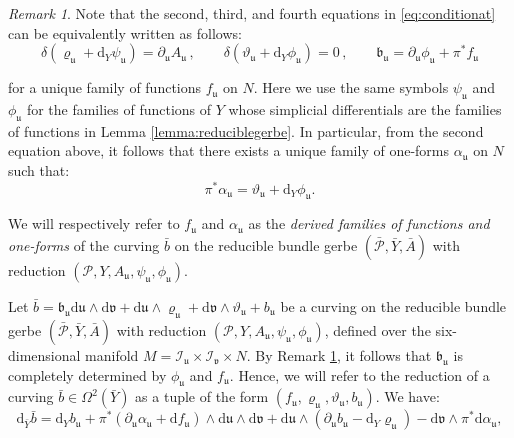 \documentclass[10pt,a4paper,twoside,reqno]{amsart}
\theoremstyle{plain}
\theoremstyle{definition}
\theoremstyle{remark}
\newtheorem{remark}[thm]{Remark}
\def\dd{\mathrm{d}}
\def\cI{\mathcal{I}}
\def\cP{\mathcal{P}}
\def\cP{\mathcal{P}}
\def\dd{\mathrm{d}}
\def\fru{\mathfrak{u}}
\def\frv{\mathfrak{v}}
\begin{document}
\begin{remark}
\label{remark:bdecomposition}
Note that the second, third, and fourth equations in \eqref{eq:conditionat} can be equivalently written as follows:
\begin{equation*}
\delta (\varrho_{\fru} + \dd_{Y} \psi_{\fru}) = \partial_{\fru} A_{\fru}   \, , \qquad  \delta (\vartheta_{\fru} + \dd_{Y} \phi_{\fru}) = 0 \, , \qquad   \mathfrak{b}_{\fru} =  \partial_{\fru} \phi_{\fru} + \pi^{\ast} f_{\fru}
\end{equation*}

\noindent
for a unique family of functions $f_{\fru}$ on $N$. Here we use the same symbols $\psi_\fru$ and $\phi_\fru$ for the families of functions of $Y$ whose simplicial differentials are the families of functions in Lemma \ref{lemma:reduciblegerbe}. In particular, from the second equation above, it follows that there exists a unique family of one-forms $\alpha_{\fru}$ on $N$ such that:
\begin{equation*}
\pi^{\ast} \alpha_{\fru} =   \vartheta_{\fru} + \dd_{Y} \phi_{\fru}.
\end{equation*}

\noindent
We will respectively refer to $f_{\fru}$ and $\alpha_{\fru}$ as the \emph{derived families of functions and one-forms} of the curving $\bar{b}$ on the reducible bundle gerbe $(\bar{\cP},\bar{Y},\bar{A})$ with reduction $(\cP,Y,A_{\fru} , \psi_{\fru} , \phi_{\fru})$.
\end{remark} 

\noindent
Let $\bar{b} = \mathfrak{b}_{\fru} \dd \fru \wedge \dd \frv + \dd \fru \wedge \varrho_{\fru} + \dd \frv \wedge \vartheta_{\fru}   + b_{\fru}$ be a curving on the reducible bundle gerbe $(\bar{\cP},\bar{Y},\bar{A})$ with reduction $(\cP,Y,A_{\fru} , \psi_{\fru} , \phi_{\fru})$, defined over the six-dimensional manifold $M = \cI_{\fru}\times \cI_{\frv} \times N$. By Remark \ref{remark:bdecomposition}, it follows that $\mathfrak{b}_{\fru}$ is completely determined by $\phi_{\fru}$ and $f_{\fru}$. Hence, we will refer to the reduction of a curving $\bar{b}\in \Omega^2(\bar{Y})$ as a tuple of the form $(f_{\fru},\varrho_{\fru},\vartheta_{\fru},b_{\fru})$. We have:
\begin{equation*}
\dd_{\bar{Y}}\bar{b} = \dd_Y b_{\fru} + \pi^{\ast}(\partial_{\fru}\alpha_{\fru} + \dd f_{\fru})\wedge \dd\fru \wedge \dd \frv + \dd \fru \wedge (\partial_{\fru} b_{\fru} - \dd_Y \varrho_{\fru})  - \dd\frv \wedge \pi^{\ast}\dd \alpha_{\fru},
\end{equation*}
\end{document}
